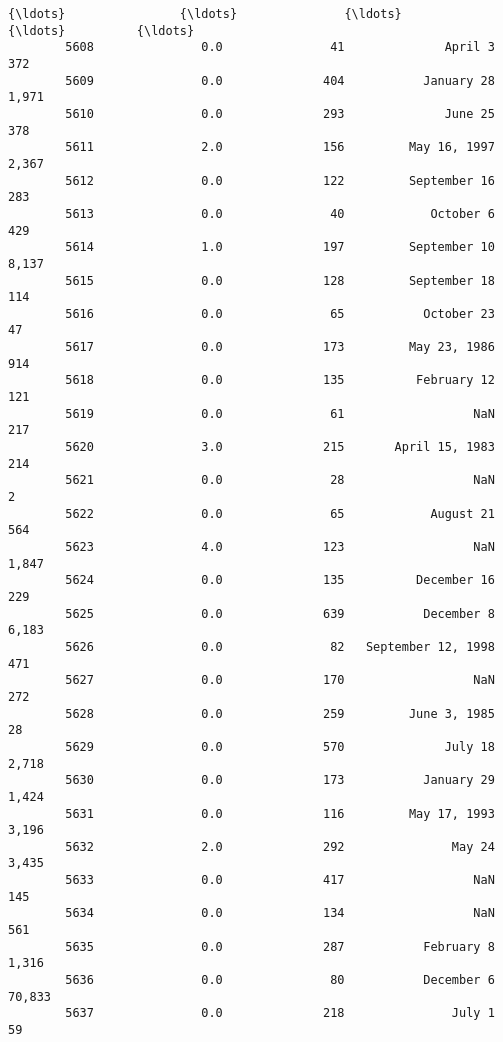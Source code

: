 \documentclass[11pt]{article}
\begin{document}
\begin{Verbatim}[commandchars=\\\{\}]
        {\ldots}                {\ldots}               {\ldots}                 {\ldots}          {\ldots}   
        5608               0.0               41              April 3         372    
        5609               0.0              404           January 28       1,971    
        5610               0.0              293              June 25         378    
        5611               2.0              156         May 16, 1997       2,367    
        5612               0.0              122         September 16         283    
        5613               0.0               40            October 6         429    
        5614               1.0              197         September 10       8,137    
        5615               0.0              128         September 18         114    
        5616               0.0               65           October 23          47    
        5617               0.0              173         May 23, 1986         914    
        5618               0.0              135          February 12         121    
        5619               0.0               61                  NaN         217    
        5620               3.0              215       April 15, 1983         214    
        5621               0.0               28                  NaN           2    
        5622               0.0               65            August 21         564    
        5623               4.0              123                  NaN       1,847    
        5624               0.0              135          December 16         229    
        5625               0.0              639           December 8       6,183    
        5626               0.0               82   September 12, 1998         471    
        5627               0.0              170                  NaN         272    
        5628               0.0              259         June 3, 1985          28    
        5629               0.0              570              July 18       2,718    
        5630               0.0              173           January 29       1,424    
        5631               0.0              116         May 17, 1993       3,196    
        5632               2.0              292               May 24       3,435    
        5633               0.0              417                  NaN         145    
        5634               0.0              134                  NaN         561    
        5635               0.0              287           February 8       1,316    
        5636               0.0               80           December 6      70,833    
        5637               0.0              218               July 1          59    
        

\end{Verbatim}
\end{document}
